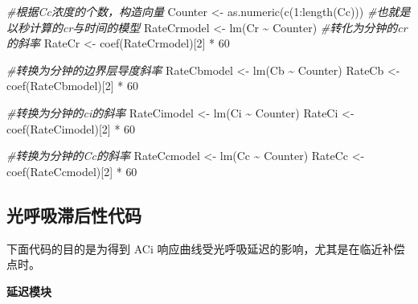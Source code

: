 \documentclass[
]{krantz}
\makeatletter
\newenvironment{Shaded}{\begin{snugshade}}{\end{snugshade}}
\newcommand{\CommentTok}[1]{\textcolor[rgb]{0.56,0.35,0.01}{\textit{#1}}}
\newcommand{\DecValTok}[1]{\textcolor[rgb]{0.00,0.00,0.81}{#1}}
\newcommand{\FunctionTok}[1]{\textcolor[rgb]{0.00,0.00,0.00}{#1}}
\newcommand{\NormalTok}[1]{#1}
\newcommand{\OtherTok}[1]{\textcolor[rgb]{0.56,0.35,0.01}{#1}}
\newcommand{\SpecialCharTok}[1]{\textcolor[rgb]{0.00,0.00,0.00}{#1}}
\newenvironment{kframe}{%
\medskip{}
\setlength{\fboxsep}{.8em}
 \def\at@end@of@kframe{}%
 \ifinner\ifhmode%
  \def\at@end@of@kframe{\end{minipage}}%
  \begin{minipage}{\columnwidth}%
 \fi\fi%
 \def\FrameCommand##1{\hskip\@totalleftmargin \hskip-\fboxsep
 \colorbox{shadecolor}{##1}\hskip-\fboxsep
     \hskip-\linewidth \hskip-\@totalleftmargin \hskip\columnwidth}%
 \MakeFramed {\advance\hsize-\width
   \@totalleftmargin\z@ \linewidth\hsize
   \@setminipage}}%
 {\par\unskip\endMakeFramed%
 \at@end@of@kframe}
\renewenvironment{Shaded}{\begin{kframe}}{\end{kframe}}
\makeatother
\begin{document}
\begin{Shaded}
\begin{Highlighting}[]
\CommentTok{\#根据Cc浓度的个数，构造向量}
\NormalTok{Counter }\OtherTok{\textless{}{-}} \FunctionTok{as.numeric}\NormalTok{(}\FunctionTok{c}\NormalTok{(}\DecValTok{1}\SpecialCharTok{:}\FunctionTok{length}\NormalTok{(Cc)))}
\CommentTok{\#也就是以秒计算的cr与时间的模型}
\NormalTok{RateCrmodel }\OtherTok{\textless{}{-}} \FunctionTok{lm}\NormalTok{(Cr }\SpecialCharTok{\textasciitilde{}}\NormalTok{ Counter)}
\CommentTok{\#转化为分钟的cr的斜率}
\NormalTok{RateCr }\OtherTok{\textless{}{-}} \FunctionTok{coef}\NormalTok{(RateCrmodel)[}\DecValTok{2}\NormalTok{] }\SpecialCharTok{*} \DecValTok{60}

\CommentTok{\#转换为分钟的边界层导度斜率}
\NormalTok{RateCbmodel }\OtherTok{\textless{}{-}} \FunctionTok{lm}\NormalTok{(Cb }\SpecialCharTok{\textasciitilde{}}\NormalTok{ Counter)}
\NormalTok{RateCb }\OtherTok{\textless{}{-}} \FunctionTok{coef}\NormalTok{(RateCbmodel)[}\DecValTok{2}\NormalTok{] }\SpecialCharTok{*} \DecValTok{60}

\CommentTok{\#转换为分钟的ci的斜率}
\NormalTok{RateCimodel }\OtherTok{\textless{}{-}} \FunctionTok{lm}\NormalTok{(Ci }\SpecialCharTok{\textasciitilde{}}\NormalTok{ Counter)}
\NormalTok{RateCi }\OtherTok{\textless{}{-}} \FunctionTok{coef}\NormalTok{(RateCimodel)[}\DecValTok{2}\NormalTok{] }\SpecialCharTok{*} \DecValTok{60}

\CommentTok{\#转换为分钟的Cc的斜率}
\NormalTok{RateCcmodel }\OtherTok{\textless{}{-}} \FunctionTok{lm}\NormalTok{(Cc }\SpecialCharTok{\textasciitilde{}}\NormalTok{ Counter)}
\NormalTok{RateCc }\OtherTok{\textless{}{-}} \FunctionTok{coef}\NormalTok{(RateCcmodel)[}\DecValTok{2}\NormalTok{] }\SpecialCharTok{*} \DecValTok{60} 
\end{Highlighting}
\end{Shaded}

\hypertarget{code-photoresp}{%
\subsection{光呼吸滞后性代码}\label{code-photoresp}}

下面代码的目的是为得到 ACi 响应曲线受光呼吸延迟的影响，尤其是在临近补偿点时。

\textbf{延迟模块}
\end{document}
